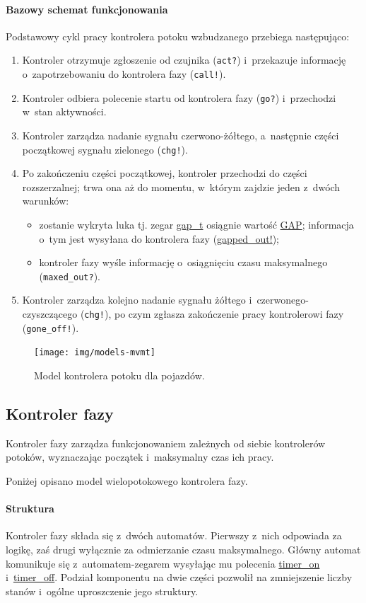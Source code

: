 \documentclass{pracamgr}
\theoremstyle{plain}
\begin{document}
\paragraph{Bazowy schemat funkcjonowania} Podstawowy cykl pracy
kontrolera potoku wzbudzanego przebiega następująco:
\begin{enumerate}
  \item Kontroler otrzymuje zgłoszenie od czujnika (\texttt{act?}) i~przekazuje
  informację o~zapotrzebowaniu do kontrolera fazy (\texttt{call!}).
  \item Kontroler odbiera polecenie startu od kontrolera fazy
  (\texttt{go?}) i~przechodzi w~stan aktywności.
  \item Kontroler zarządza nadanie sygnału czerwono-żółtego,
  a~następnie części początkowej sygnału zielonego (\texttt{chg!}).
  \item Po zakończeniu części początkowej, kontroler przechodzi do
  części rozszerzalnej; trwa ona aż do momentu, w~którym zajdzie jeden
  z~dwóch warunków:
  \begin{itemize}
    \item zostanie wykryta luka tj. zegar \url{gap_t} osiągnie wartość
    \url{GAP}; informacja o~tym jest wysyłana do kontrolera fazy
    (\url{gapped_out!});
    \item kontroler fazy wyśle informację o~osiągnięciu czasu
    maksymalnego (\texttt{maxed\_out?}).
  \end{itemize}
  \item Kontroler zarządza kolejno nadanie sygnału żółtego
  i~czerwonego-czyszczącego (\texttt{chg!}), po czym zgłasza zakończenie pracy
  kontrolerowi fazy (\texttt{gone\_off!}).
\end{enumerate}

\begin{figure}
  \centering
  \texttt{[image: img/models-mvmt]}
  \caption{Model kontrolera potoku dla pojazdów.}
  \label{img:mvmt-ctrl}
\end{figure}

\subsection{Kontroler fazy}
\label{ss:models:models:phase-ctrl}
Kontroler fazy zarządza funkcjonowaniem zależnych od siebie
kontrolerów potoków, wyznaczając początek i~maksymalny czas ich pracy.

Poniżej opisano model wielopotokowego kontrolera fazy.
\paragraph{Struktura} Kontroler fazy składa się z~dwóch
automatów. Pierwszy z~nich odpowiada za logikę, zaś drugi wyłącznie za
odmierzanie czasu maksymalnego. Główny automat komunikuje się
z~automatem-zegarem wysyłając mu polecenia \url{timer_on}
i~\url{timer_off}. Podział komponentu na dwie części pozwolił na
zmniejszenie liczby stanów i~ogólne uproszczenie jego struktury.
\end{document}
